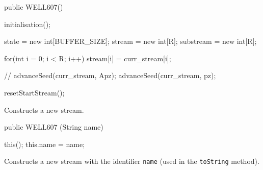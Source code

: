 \begin{code}   
   public WELL607() \begin{hide} {
      initialisation();

      state = new int[BUFFER_SIZE];
      stream = new int[R];
      substream = new int[R];

      for(int i = 0; i < R; i++)
         stream[i] = curr_stream[i];

//      advanceSeed(curr_stream, Apz);
      advanceSeed(curr_stream, pz);

      resetStartStream();
   } \end{hide}
\end{code}
\begin{tabb} Constructs a new stream.
\end{tabb}
\begin{code}

   public WELL607 (String name) \begin{hide} {
      this();
      this.name = name;
   }\end{hide}
\end{code}
\begin{tabb} Constructs a new stream with the identifier \texttt{name}
  (used in the \texttt{toString} method).
\end{tabb}
\begin{htmlonly}
\end{htmlonly}

